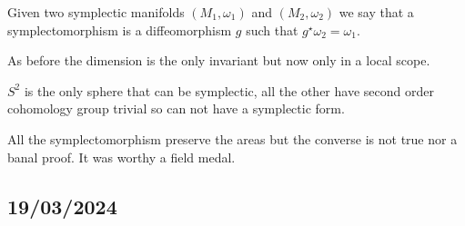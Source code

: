 \begin{Dfn}
    Given two symplectic manifolds $(M_1,\omega_1)$ and $(M_2,\omega_2)$ we say that a symplectomorphism is a diffeomorphism $g$ such that $g^\star\omega_2=\omega_1$.

    As before the dimension is the only invariant but now only in a local scope.
\end{Dfn}


\begin{Prp}
    $S^2$ is the only sphere that can be symplectic, all the other have second order cohomology group trivial so can not have a symplectic form.
\end{Prp}

\begin{Prp}
    All the symplectomorphism preserve the areas but the converse is not true nor a banal proof. It was worthy a field medal.
\end{Prp}

\subsection*{19/03/2024}
